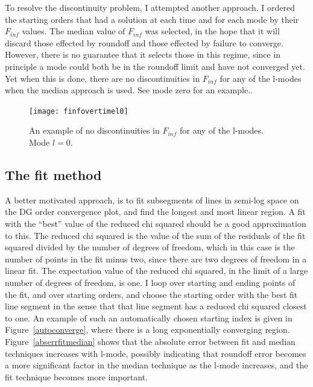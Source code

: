 To resolve the discontinuity problem, I attempted another approach. I ordered the starting orders that had a solution at each time and for each mode by their $F_{inf}$ values. The median value of $F_{inf}$ was selected, in the hope that it will discard those effected by roundoff and those effected by failure to converge. However, there is no guarantee that it selects those in this regime, since in principle a mode could both be in the roundoff limit and have not converged yet. Yet when this is done, there are no discontinuities in $F_{inf}$ for any of the l-modes when the median approach is used. See mode zero for an example..

\begin{figure}
  \texttt{[image: finfovertimel0]}
  \caption{An example of no discontinuities in $F_{inf}$ for any of the l-modes. Mode $l=0$.}
\end{figure}


\subsection{The fit method}
A better motivated approach, is to fit subsegments of lines in semi-log space on the DG order convergence plot, and find the longest and most linear region. A fit with the ``best'' value of the reduced chi squared should be a good approximation to this. The reduced chi squared is the value of the sum of the residuals of the fit squared divided by the number of degrees of freedom, which in this case is the number of points in the fit minus two, since there are two degrees of freedom in a linear fit. The expectation value of the reduced chi squared, in the limit of a large number of degrees of freedom, is one. I loop over starting and ending points of the fit, and over starting orders, and choose the starting order with the best fit line segment in the sense that that line segment has a reduced chi squared closest to one. An example of such an automatically chosen starting index is given in Figure~\ref{autoconverge}, where there is a long exponentially converging region. Figure~\ref{abserrfitmedian} shows that the absolute error between fit and median techniques increases with l-mode, possibly indicating that roundoff error becomes a more significant factor in the median technique as the l-mode increases, and the fit technique becomes more important. 

